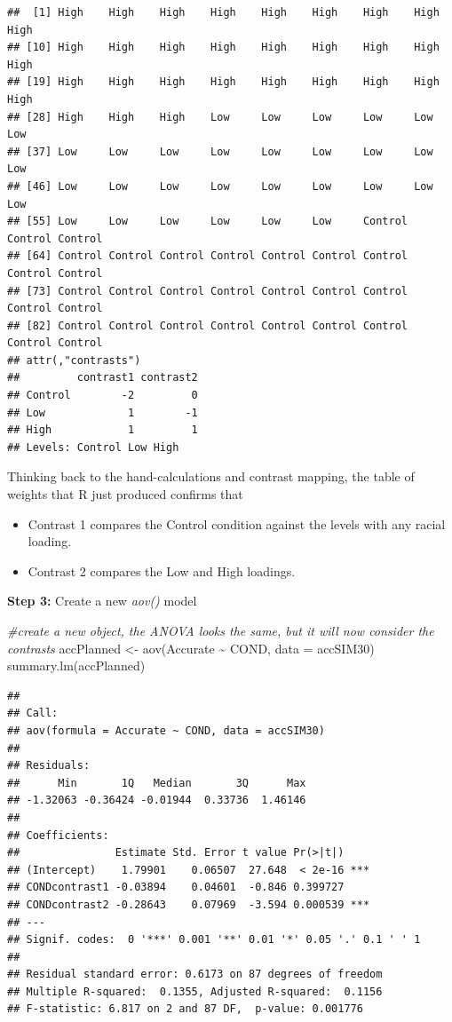 \documentclass[
  english,
]{book}
\newenvironment{Shaded}{\begin{snugshade}}{\end{snugshade}}
\newcommand{\AttributeTok}[1]{\textcolor[rgb]{0.77,0.63,0.00}{#1}}
\newcommand{\CommentTok}[1]{\textcolor[rgb]{0.56,0.35,0.01}{\textit{#1}}}
\newcommand{\FunctionTok}[1]{\textcolor[rgb]{0.00,0.00,0.00}{#1}}
\newcommand{\NormalTok}[1]{#1}
\newcommand{\OtherTok}[1]{\textcolor[rgb]{0.56,0.35,0.01}{#1}}
\newcommand{\SpecialCharTok}[1]{\textcolor[rgb]{0.00,0.00,0.00}{#1}}
\providecommand{\tightlist}{%
  \setlength{\itemsep}{0pt}\setlength{\parskip}{0pt}}
\begin{document}
\begin{verbatim}
##  [1] High    High    High    High    High    High    High    High    High   
## [10] High    High    High    High    High    High    High    High    High   
## [19] High    High    High    High    High    High    High    High    High   
## [28] High    High    High    Low     Low     Low     Low     Low     Low    
## [37] Low     Low     Low     Low     Low     Low     Low     Low     Low    
## [46] Low     Low     Low     Low     Low     Low     Low     Low     Low    
## [55] Low     Low     Low     Low     Low     Low     Control Control Control
## [64] Control Control Control Control Control Control Control Control Control
## [73] Control Control Control Control Control Control Control Control Control
## [82] Control Control Control Control Control Control Control Control Control
## attr(,"contrasts")
##         contrast1 contrast2
## Control        -2         0
## Low             1        -1
## High            1         1
## Levels: Control Low High
\end{verbatim}

Thinking back to the hand-calculations and contrast mapping, the table of weights that R just produced confirms that

\begin{itemize}
\tightlist
\item
  Contrast 1 compares the Control condition against the levels with any racial loading.\\
\item
  Contrast 2 compares the Low and High loadings.
\end{itemize}

\textbf{Step 3:} Create a new \emph{aov()} model

\begin{Shaded}
\begin{Highlighting}[]
\CommentTok{\#create a new object, the ANOVA looks the same, but it will now consider the contrasts}
\NormalTok{accPlanned }\OtherTok{\textless{}{-}} \FunctionTok{aov}\NormalTok{(Accurate }\SpecialCharTok{\textasciitilde{}}\NormalTok{ COND, }\AttributeTok{data =}\NormalTok{ accSIM30)}
\FunctionTok{summary.lm}\NormalTok{(accPlanned)}
\end{Highlighting}
\end{Shaded}

\begin{verbatim}
## 
## Call:
## aov(formula = Accurate ~ COND, data = accSIM30)
## 
## Residuals:
##      Min       1Q   Median       3Q      Max 
## -1.32063 -0.36424 -0.01944  0.33736  1.46146 
## 
## Coefficients:
##               Estimate Std. Error t value Pr(>|t|)    
## (Intercept)    1.79901    0.06507  27.648  < 2e-16 ***
## CONDcontrast1 -0.03894    0.04601  -0.846 0.399727    
## CONDcontrast2 -0.28643    0.07969  -3.594 0.000539 ***
## ---
## Signif. codes:  0 '***' 0.001 '**' 0.01 '*' 0.05 '.' 0.1 ' ' 1
## 
## Residual standard error: 0.6173 on 87 degrees of freedom
## Multiple R-squared:  0.1355, Adjusted R-squared:  0.1156 
## F-statistic: 6.817 on 2 and 87 DF,  p-value: 0.001776
\end{verbatim}
\end{document}
